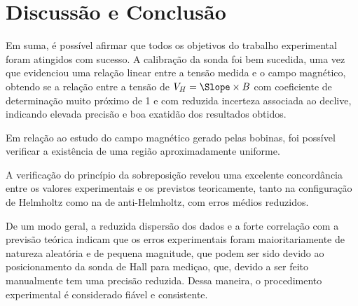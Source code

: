 \section{Discussão e Conclusão}
Em suma, é possível afirmar que todos os objetivos do trabalho experimental foram atingidos com sucesso. A calibração da sonda foi bem sucedida, uma vez que evidenciou uma relação linear entre a tensão medida e o campo magnético, obtendo se a relação entre a tensão de $V_H = \Slope \times B$  com coeficiente de determinação muito próximo de 1 e com reduzida incerteza associada ao declive, indicando elevada precisão e boa exatidão dos resultados obtidos.

Em relação ao estudo do campo magnético gerado pelas bobinas, foi possível verificar a existência de uma região aproximadamente uniforme.

A verificação do princípio da sobreposição revelou uma excelente concordância entre os valores experimentais e os previstos teoricamente, tanto na configuração de Helmholtz como na de anti-Helmholtz, com erros médios reduzidos.

De um modo geral, a reduzida dispersão dos dados e a forte correlação com a previsão teórica indicam que os erros experimentais foram maioritariamente de natureza aleatória e de pequena magnitude, que podem ser sido devido ao posicionamento da sonda de Hall para mediçao, que, devido a ser feito manualmente tem uma precisão reduzida. Dessa maneira, o procedimento experimental é considerado fiável e consistente.

